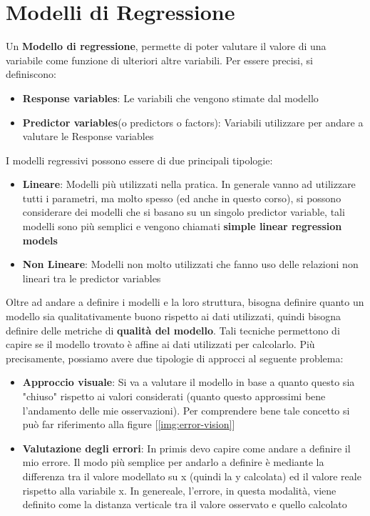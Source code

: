 \chapter{Modelli di Regressione}
Un \textbf{Modello di regressione}, permette di poter valutare il valore di una variabile come funzione di ulteriori altre variabili. Per essere precisi, si definiscono:
\begin{itemize}
    \item \textbf{Response variables}: Le variabili che vengono stimate dal modello
    \item \textbf{Predictor variables}(o predictors o factors): Variabili utilizzare per andare a valutare le Response variables
\end{itemize}
I modelli regressivi possono essere di due principali tipologie:
\begin{itemize}
    \item \textbf{Lineare}: Modelli più utilizzati nella pratica. In generale vanno ad utilizzare tutti i parametri, ma molto spesso (ed anche in questo corso), si possono considerare dei modelli che si basano su un singolo predictor variable, tali modelli sono più semplici e vengono chiamati \textbf{simple linear regression models} 
    \item \textbf{Non Lineare}: Modelli non molto utilizzati che fanno uso delle relazioni non lineari tra le predictor variables
\end{itemize}

Oltre ad andare a definire i modelli e la loro struttura, bisogna definire quanto un modello sia qualitativamente buono rispetto ai dati utilizzati, quindi bisogna definire delle metriche di \textbf{qualità del modello}. Tali tecniche permettono di capire se il modello trovato è affine ai dati utilizzati per calcolarlo. Più precisamente, possiamo avere due tipologie di approcci al seguente problema:
\begin{itemize}
    \item \textbf{Approccio visuale}: Si va a valutare il modello in base a quanto questo sia "chiuso" rispetto ai valori considerati (quanto questo approssimi bene l'andamento delle mie osservazioni). Per comprendere bene tale concetto si può far riferimento alla figure [\ref{img:error-vision}]
    
    \item \textbf{Valutazione degli errori}: In primis devo capire come andare a definire il mio errore. Il modo più semplice per andarlo a definire è mediante la differenza tra il valore modellato su x (quindi la y calcolata) ed il valore reale rispetto alla variabile x. In genereale, l'errore, in questa modalità, viene definito come la distanza verticale tra il valore osservato e quello calcolato
\end{itemize}

